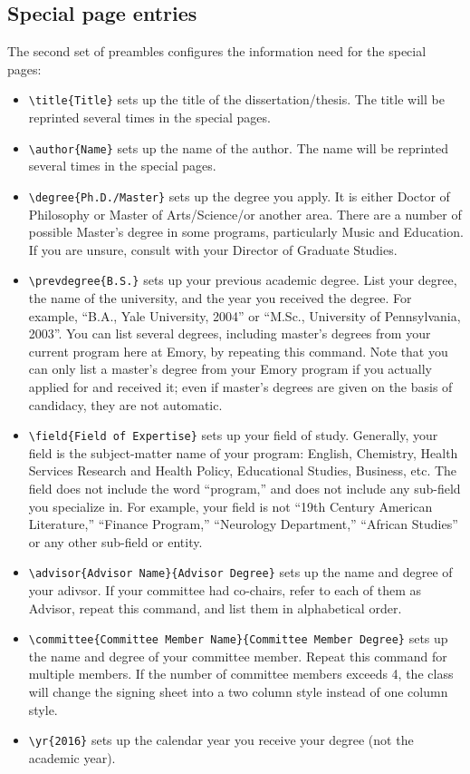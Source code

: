 \documentclass[draft]{emory}
\begin{document}
\subsection{Special page entries}
The second set of preambles configures the information need for the special pages:

\begin{itemize}
\item \Verb|\title{Title}| sets up the title of the dissertation/thesis. The title 
will be reprinted several times in the special pages.
\item \Verb|\author{Name}| sets up the name of the author. The name will be reprinted
several times in the special pages. 
\item \Verb|\degree{Ph.D./Master}| sets up the degree you apply. It is either Doctor
of Philosophy or Master of Arts/Science/or another area.  There are a number of 
possible Master’s degree in some programs, particularly Music and Education.  
If you are unsure, consult with your Director of Graduate Studies.
\item \Verb|\prevdegree{B.S.}| sets up your previous academic degree. List your 
degree, the name of the university, and the year you received the degree.  
For example, ``B.A., Yale University, 2004'' or ``M.Sc., University of Pennsylvania, 2003''.
You can list several degrees, including master’s degrees from your current 
program here at Emory, by repeating this command.
Note that you can only list a master’s degree from your
Emory program if you actually applied for and received it; even if master’s 
degrees are given on the basis of candidacy, they are not automatic. 
\item \Verb|\field{Field of Expertise}| sets up your field of study. Generally, 
your field is the subject-matter name of your program: English, Chemistry, 
Health Services Research and Health Policy, Educational Studies, Business, etc.  
The field does not include the word “program,” and does not include any sub-field
you specialize in.  For example, your field is not ``19th Century American Literature,''
``Finance Program,'' ``Neurology Department,'' ``African Studies'' or any other
sub-field or entity.
\item \Verb|\advisor{Advisor Name}{Advisor Degree}| sets up the name and degree of your 
adivsor. If your committee had co-chairs, refer to each of them as Advisor,
repeat this command, and list them in alphabetical order. 
\item \Verb|\committee{Committee Member Name}{Committee Member Degree}|  sets up
the name and degree of your committee member. Repeat this command for multiple 
members. If the number of committee members exceeds 4, the class will change
the signing sheet into a two column style instead of one column style.
\item \Verb|\yr{2016}| sets up the calendar year you receive your degree
(not the academic year).
\end{itemize}
\end{document}
